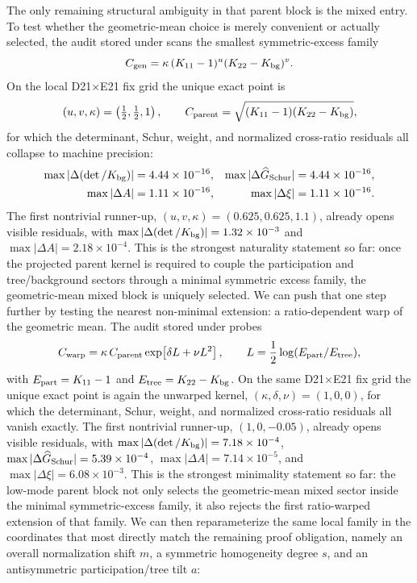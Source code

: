 \documentclass[aps,prd,onecolumn,notitlepage,nofootinbib,superscriptaddress,11pt,floatfix]{revtex4-2}
\begin{document}
The only remaining structural ambiguity in that parent block is the mixed entry. To test whether the geometric-mean choice is merely convenient or actually selected, the audit stored under  scans the smallest symmetric-excess family
\[
C_{\rm gen}=\kappa\,(K_{11}-1)^u (K_{22}-K_{\rm bg})^v.
\]
On the local D21$\times$E21 fix grid the unique exact point is
\[
(u,v,\kappa)=\left(\tfrac12,\tfrac12,1\right),
\qquad
C_{\rm parent}=\sqrt{(K_{11}-1)(K_{22}-K_{\rm bg})},
\]
for which the determinant, Schur, weight, and normalized cross-ratio residuals all collapse to machine precision:
\[
\begin{aligned}
\max|\Delta(\det/K_{\rm bg})|&=4.44\times10^{-16},&
\max|\Delta \widehat G_{\rm Schur}|&=4.44\times10^{-16},\\
\max|\Delta A|&=1.11\times10^{-16},&
\max|\Delta\xi|&=1.11\times10^{-16}.
\end{aligned}
\]
The first nontrivial runner-up, $(u,v,\kappa)=(0.625,0.625,1.1)$, already opens visible residuals, with $\max|\Delta(\det/K_{\rm bg})|=1.32\times10^{-3}$ and $\max|\Delta A|=2.18\times10^{-4}$. This is the strongest naturality statement so far: once the projected parent kernel is required to couple the participation and tree/background sectors through a minimal symmetric excess family, the geometric-mean mixed block is uniquely selected.
We can push that one step further by testing the nearest non-minimal extension: a ratio-dependent warp of the geometric mean. The audit stored under  probes
\[
C_{\rm warp}
=
\kappa\,C_{\rm parent}\exp\!\left[\delta L+\nu L^2\right],
\qquad
L=\frac12\log(E_{\rm part}/E_{\rm tree}),
\]
with $E_{\rm part}=K_{11}-1$ and $E_{\rm tree}=K_{22}-K_{\rm bg}$. On the same D21$\times$E21 fix grid the unique exact point is again the unwarped kernel, $(\kappa,\delta,\nu)=(1,0,0)$, for which the determinant, Schur, weight, and normalized cross-ratio residuals all vanish exactly. The first nontrivial runner-up, $(1,0,-0.05)$, already opens visible residuals, with $\max|\Delta(\det/K_{\rm bg})|=7.18\times10^{-4}$, $\max|\Delta \widehat G_{\rm Schur}|=5.39\times10^{-4}$, $\max|\Delta A|=7.14\times10^{-5}$, and $\max|\Delta \xi|=6.08\times10^{-3}$. This is the strongest minimality statement so far: the low-mode parent block not only selects the geometric-mean mixed sector inside the minimal symmetric-excess family, it also rejects the first ratio-warped extension of that family.
We can then reparameterize the same local family in the coordinates that most directly match the remaining proof obligation, namely an overall normalization shift $m$, a symmetric homogeneity degree $s$, and an antisymmetric participation/tree tilt $a$:
\end{document}
